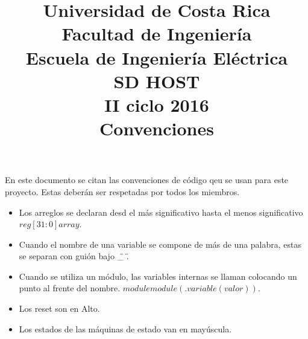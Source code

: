 

\title{Universidad de Costa Rica\\{\small Facultad de Ingeniería\\Escuela de Ingeniería
    Eléctrica\\SD HOST\\II ciclo 2016\\\vspace*{0.55in} Convenciones}}





En este documento se citan las convenciones de código qeu se usan para este proyecto. Estas deberán
ser respetadas por todos los miembros. 

\begin{itemize}
\item Los arreglos se declaran desd el más significativo hasta el menos significativo $reg [31:0] array$.
\item Cuando el nombre de una variable se compone de más de una palabra, estas se separan con guión
  bajo \"\_ \".
\item Cuando se utiliza un módulo, las variables internas se llaman colocando un punto al frente del
  nombre. $module module(.variable(valor))$. 
\item Los reset son en Alto.
\item Los estados de las máquinas de estado van en mayúscula.
\end{itemize}
\newpage


\grid
